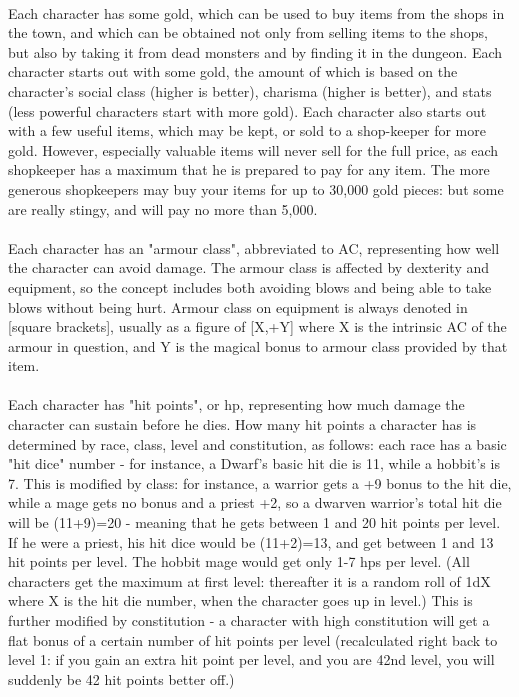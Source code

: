 \paragraph{}Each character has some gold, which can be used to buy items from the
shops in the town, and which can be obtained not only from selling items
to the shops, but also by taking it from dead monsters and by finding it
in the dungeon. Each character starts out with some gold, the amount of
which is based on the character's social class (higher is better),
charisma (higher is better), and stats (less powerful characters start
with more gold). Each character also starts out with a few useful
items, which may be kept, or sold to a shop-keeper for more gold.
However, especially valuable items will never sell for the full price,
as each shopkeeper has a maximum that he is prepared to pay for any
item. The more generous shopkeepers may buy your items for up to 30,000
gold pieces: but some are really stingy, and will pay no more than
5,000.

\paragraph{}Each character has an "armour class", abbreviated to AC, representing
how well the character can avoid damage. The armour class is affected
by dexterity and equipment, so the concept includes both avoiding blows
and being able to take blows without being hurt. Armour class on
equipment is always denoted in [square brackets], usually as a figure of
[X,+Y] where X is the intrinsic AC of the armour in question, and Y is
the magical bonus to armour class provided by that item.

\paragraph{}Each character has "hit points", or hp, representing how much damage the
character can sustain before he dies. How many hit points a character
has is determined by race, class, level and constitution, as follows:
each race has a basic "hit dice" number - for instance, a Dwarf's basic
hit die is 11, while a hobbit's is 7. This is modified by class: for
instance, a warrior gets a +9 bonus to the hit die, while a mage gets no
bonus and a priest +2, so a dwarven warrior's total hit die will be
(11+9)=20 - meaning that he gets between 1 and 20 hit points per level.
If he were a priest, his hit dice would be (11+2)=13, and get between 1
and 13 hit points per level. The hobbit mage would get only 1-7 hps per
level. (All characters get the maximum at first level: thereafter it is
a random roll of 1dX where X is the hit die number, when the character
goes up in level.) This is further modified by constitution - a
character with high constitution will get a flat bonus of a certain
number of hit points per level (recalculated right back to level 1: if
you gain an extra hit point per level, and you are 42nd level, you will
suddenly be 42 hit points better off.)

